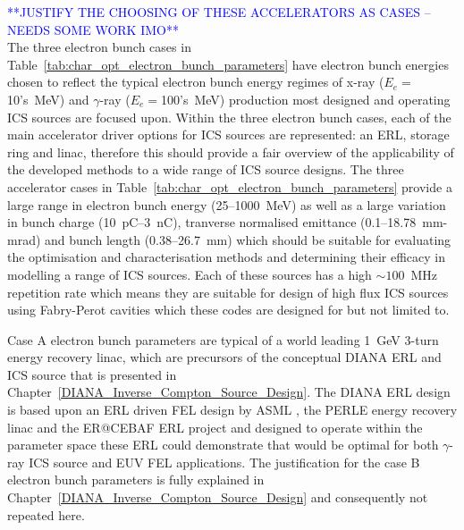 \documentclass[../main.tex]{subfiles}
\begin{document}
\textcolor{blue}{**JUSTIFY THE CHOOSING OF THESE ACCELERATORS AS CASES -- NEEDS SOME WORK IMO**\\}
The three electron bunch cases in Table~\ref{tab:char_opt_electron_bunch_parameters} have electron bunch energies chosen to reflect the typical electron bunch energy regimes of x-ray ($E_{e} =$10's~\si{\mega\electronvolt}) and $\gamma$-ray ($E_{e} =$100's~\si{\mega\electronvolt}) production most designed and operating ICS sources are focused upon. Within the three electron bunch cases, each of the main accelerator driver options for ICS sources are represented: an ERL, storage ring and linac, therefore this should provide a fair overview of the applicability of the developed methods to a wide range of ICS source designs. The three accelerator cases in Table~\ref{tab:char_opt_electron_bunch_parameters} provide a large range in electron bunch energy (25--1000~\si{\mega\electronvolt}) as well as a large variation in bunch charge (10~\si{\pico\coulomb}--3~\si{\nano\coulomb}), tranverse normalised emittance (0.1--18.78~\si{\milli\meter}-\si{\milli\radian}) and bunch length (0.38--26.7~\si{\milli\meter}) which should be suitable for evaluating the optimisation and characterisation methods and determining their efficacy in modelling a range of ICS sources. Each of these sources has a high $\sim100$~\si{\mega\hertz} repetition rate which means they are suitable for design of high flux ICS sources using Fabry-Perot cavities which these codes are designed for but not limited to. 

Case A electron bunch parameters are typical of a world leading 1~\si{\giga\electronvolt} 3-turn energy recovery linac, which are precursors of the conceptual DIANA ERL and ICS source that is presented in Chapter~\ref{DIANA_Inverse_Compton_Source_Design}. The DIANA ERL design is based upon an ERL driven FEL design by ASML \cite{akkermans2017compact}, the PERLE energy recovery linac \cite{angal2018perle} and the ER@CEBAF ERL project \cite{meot2016er,bogacz2016er} and designed to operate within the parameter space these ERL could demonstrate that would be optimal for both $\gamma$-ray ICS source and EUV FEL applications. The justification for the case B electron bunch parameters is fully explained in Chapter~\ref{DIANA_Inverse_Compton_Source_Design} and consequently not repeated here.       
\end{document}
